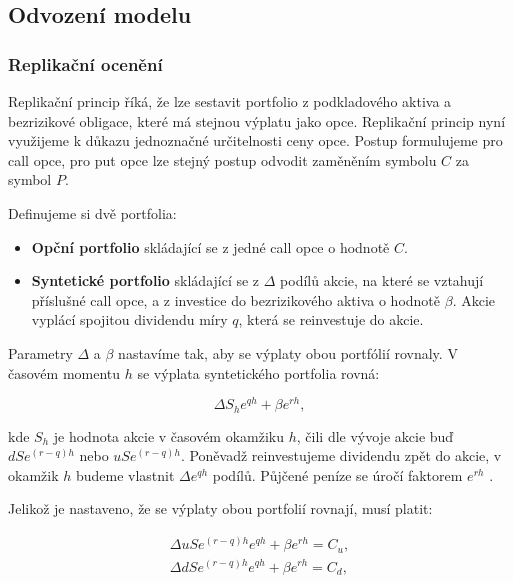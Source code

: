 \documentclass[male,czech,api_bc]{kitheses}
\begin{document}
 \subsection{Odvození modelu}

 \subsubsection{Replikační ocenění}

 \label{sec:binom_replication}
 Replikační princip říká, že lze sestavit portfolio z podkladového aktiva a bezrizikové obligace, které má stejnou výplatu jako opce. Replikační princip nyní využijeme k důkazu jednoznačné určitelnosti ceny opce. Postup formulujeme pro call opce, pro put opce lze stejný postup odvodit zaměněním symbolu $C$ za symbol $P$.

 Definujeme si dvě portfolia:
  \begin{itemize}
    \item \textbf{Opční portfolio} skládající se z jedné call opce o hodnotě $C$.
    \item \textbf{Syntetické portfolio} skládající se z $\Delta$ podílů akcie, na které se vztahují příslušné call opce, a z investice do bezrizikového aktiva o hodnotě $\beta$. Akcie vyplácí spojitou dividendu míry $q$, která se reinvestuje do akcie.
  \end{itemize}

  Parametry $\Delta$ a $\beta$ nastavíme tak, aby se výplaty obou portfólií rovnaly. V časovém momentu $h$ se výplata syntetického portfolia rovná:

  \begin{equation}
    \Delta S_h e^{qh} + \beta e^{rh},
  \end{equation}

  kde $S_h$ je hodnota akcie v časovém okamžiku $h$, čili dle vývoje akcie buď $dS e^{(r-q)h}$ nebo $uS e^{(r-q)h}$. Poněvadž reinvestujeme dividendu zpět do akcie, v okamžik $h$ budeme vlastnit $\Delta e^{qh}$ podílů. Půjčené peníze se úročí faktorem $e^{rh}$ \parencites{CoxRossRubinstein1979}[kapitola~13]{McDonald2013}.

  Jelikož je nastaveno, že se výplaty obou portfolií rovnají, musí platit:

  \begin{gather}
    \Delta uS e^{(r-q)h} e^{qh} + \beta e^{rh} = C_u, \\
    \Delta dS e^{(r-q)h} e^{qh} + \beta e^{rh} = C_d, 
  \end{gather}
\end{document}
